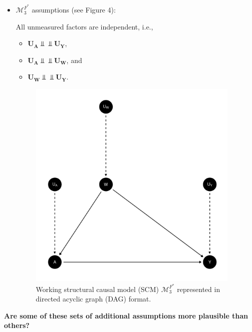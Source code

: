 \documentclass{article}\usepackage[]{graphicx}\usepackage[]{xcolor}
\newenvironment{knitrout}{}{} %
\begin{document}
\begin{enumerate}[label=\textbf{\arabic*.}]
\begin{enumerate}[label=\textbf{(\alph*)}]
\begin{itemize}
  \item $\mathcal{M}^{F^*}_3$ assumptions (see Figure 4): 
  
  All unmeasured factors are independent, i.e., 
  
  \begin{itemize} 
  
    \item $\bm{U_A} \Perp \!\!\!\! \Perp \bm{U_Y}$,
    
    \item $\bm{U_A} \Perp \!\!\!\! \Perp \bm{U_W}$, and
    
    \item $\bm{U_W} \Perp \!\!\!\! \Perp \bm{U_Y}$.
    
  \end{itemize}
  
\begin{figure}
  \caption{Working structural causal model (SCM) $\mathcal{M}^{F^*}_3$ represented in directed acyclic graph (DAG) format.}
  \centering
    
\begin{knitrout}
\color{fgcolor}
\includegraphics[width=4in]{figure/unnamed-chunk-5-1} 

\end{knitrout}

\end{figure}

\end{itemize}

\pagebreak
 
\textbf{Are some of these sets of additional assumptions more plausible than others?}


\end{enumerate}
\end{enumerate}
\end{document}

